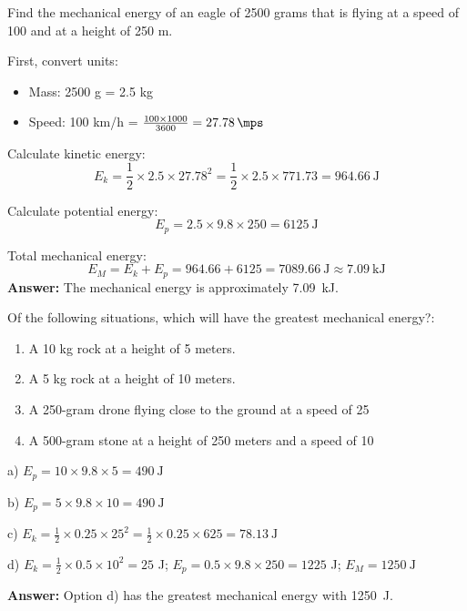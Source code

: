 \begin{exercise}
    Find the mechanical energy of an eagle of 2500 grams that is flying at a speed of \qty{100}{\kmph} and at a height of 250 m.
    \begin{solu}
        First, convert units:
        \begin{itemize}
            \item Mass: 2500 g = 2.5 kg
            \item Speed: 100 km/h = $\frac{100 \times 1000}{3600} = \qty{27.78}{\mps}$
        \end{itemize}
        Calculate kinetic energy:
        \[
            E_k = \frac{1}{2} \times 2.5 \times 27.78^2 = \frac{1}{2} \times 2.5 \times 771.73 = \qty{964.66}{\joule}
        \]

        Calculate potential energy:
        \[
            E_p = 2.5 \times 9.8 \times 250 = \qty{6125}{\joule}
        \]

        Total mechanical energy:
        \[
            E_M = E_k + E_p = 964.66 + 6125 = \qty{7089.66}{\joule} \approx \qty{7.09}{\kilo\joule}
        \]
        \textbf{Answer:} The mechanical energy is approximately \qty{7.09}{\kilo\joule}.
    \end{solu}
\end{exercise}

\begin{exercise}
    Of the following situations, which will have the greatest mechanical energy?:
    \begin{enumerate}[label=\alph*)]
\item A 10 kg rock at a height of 5 meters.
\item A 5 kg rock at a height of 10 meters.
\item A 250-gram drone flying close to the ground at a speed of \qty{25}{\mps}
\item A 500-gram stone at a height of 250 meters and a speed of \qty{10}{\mps}
    \end{enumerate}
    \begin{solu}
        a) $E_p = 10 \times 9.8 \times 5 = \qty{490}{\joule}$

        b) $E_p = 5 \times 9.8 \times 10 = \qty{490}{\joule}$

        c) $E_k = \frac{1}{2} \times 0.25 \times 25^2 = \frac{1}{2} \times 0.25 \times 625 = \qty{78.13}{\joule}$

        d) $E_k = \frac{1}{2} \times 0.5 \times 10^2 = 25$ J; $E_p = 0.5 \times 9.8 \times 250 = 1225$ J; $E_M = \qty{1250}{\joule}$

        \textbf{Answer:} Option d) has the greatest mechanical energy with \qty{1250}{\joule}.
    \end{solu}
\end{exercise}

